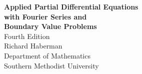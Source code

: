 
\frontmatter

\begin{titlepage}
\centering
\vspace*{3cm}
{\LARGE\bfseries Applied Partial Differential Equations\\[0.5em]
with Fourier Series and\\[0.5em]
Boundary Value Problems}\\[2cm]
{\Large Fourth Edition}\\[3cm]
{\Large Richard Haberman}\\[0.5cm]
{\large Department of Mathematics\\
Southern Methodist University}\\[4cm]
\end{titlepage}

\cleardoublepage


\mainmatter
